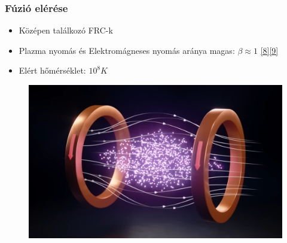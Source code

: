 \documentclass{beamer}
\begin{document}
\begin{frame}
    \frametitle{Fúzió elérése}
    \begin{itemize}
        \item Középen találkozó FRC-k
        \item Plazma nyomás és Elektromágneses nyomás aránya magas: $\beta \approx 1$ \hyperlink{8}{\small[8]}\hyperlink{9}{\small[9]}
        \item Elért hőmérséklet: $10^8K$
    \end{itemize}
    \begin{figure}
        \includegraphics[scale=0.2]{piston.png}
    \end{figure}
\end{frame}
\end{document}
